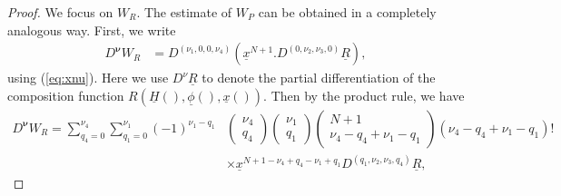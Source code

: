 \documentclass[reqno,12pt]{amsart}
\newcommand{\eqlab}[1]{\label{eq:#1}}
\renewcommand{\eqref}[1]{(\ref{eq:#1})}
\numberwithin{equation}{section}
\begin{document}
\begin{proof}
We focus on $W_R$. The estimate of $W_P$ can be obtained in a completely analogous way.
First, we write 
 \begin{align*}
  D^{\mathbf \nu} W_R &= D^{(\nu_1,0,0,\nu_4)} \left(\underline x^{N+1} .D^{(0,\nu_2,\nu_3,0)}\underline R\right),%
 \end{align*}
using \eqref{xnu}. Here we use $D^{\nu } \underline R$ to denote the partial differentiation of the composition function  $R(\underline H(),\underline \phi(),\underline x())$. Then by the product rule, we have
\begin{equation}\eqlab{DW}
\begin{aligned}
 D^{\mathbf \nu} W_R = \sum_{q_4=0}^{\nu_4}\sum_{q_1=0}^{\nu_1} (-1)^{\nu_1-q_1}& \begin{pmatrix}
                                                                \nu_4\\
                                                                q_4
                                                               \end{pmatrix} \begin{pmatrix}
                                                                \nu_1\\
                                                                q_1
                                                               \end{pmatrix}
                                                               \begin{pmatrix}
                                                                N+1\\
                                                                \nu_4-q_4+\nu_1-q_1
                                                               \end{pmatrix}
                                                               (\nu_4-q_4+\nu_1-q_1)! \\
                                                               &\times \underline x^{N+1-\nu_4+q_4-\nu_1+q_1} D^{(q_1,\nu_2,\nu_3,q_4)}\underline R,
                                                               \end{aligned}

\end{equation}
\end{proof}
\end{document}
